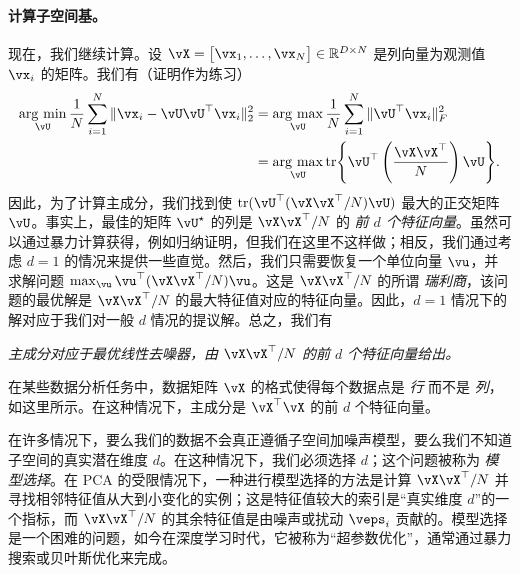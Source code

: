 \documentclass[../../book-main_zh.tex]{subfiles}
\begin{document}
\paragraph{计算子空间基。}
现在，我们继续计算。设 \(\vX = \mat{\vx_{1}, \dots, \vx_{N}} \in \R^{D \times N}\) 是列向量为观测值 \(\vx_{i}\) 的矩阵。我们有（证明作为练习）
\begin{align}
    \argmin_{\vU}\frac{1}{N}\sum_{i = 1}^{N}\norm{\vx_{i} - \vU\vU^{\top}\vx_{i}}_{2}^{2}
    &= \argmax_{\vU}\frac{1}{N}\sum_{i = 1}^{N}\norm{\vU^{\top}\vx_{i}}_{F}^{2} \\ 
    &= \argmax_{\vU}\tr\rc{\vU^{\top}\bp{\frac{\vX\vX^{\top}}{N}}\vU}.
\end{align}
因此，为了计算主成分，我们找到使 \(\tr(\vU^{\top}(\vX\vX^{\top}/N)\vU)\) 最大的正交矩阵 \(\vU\)。事实上，最佳的矩阵 \(\vU^{\star}\) 的列是 \(\vX\vX^{\top}/N\) 的 \textit{前 \(d\) 个特征向量}。虽然可以通过暴力计算获得，例如归纳证明，但我们在这里不这样做；相反，我们通过考虑 \(d = 1\) 的情况来提供一些直觉。然后，我们只需要恢复一个单位向量 \(\vu\)，并求解问题 \(\max_{\vu} \vu^{\top}(\vX\vX^{\top}/N)\vu\)。这是 \(\vX\vX^{\top}/N\) 的所谓 \textit{瑞利商}，该问题的最优解是 \(\vX\vX^{\top}/N\) 的最大特征值对应的特征向量。因此，\(d = 1\) 情况下的解对应于我们对一般 \(d\) 情况的提议解。总之，我们有
\begin{tcolorbox}
    \textit{主成分对应于最优线性去噪器，由 \(\vX\vX^{\top}/N\) 的前 \(d\) 个特征向量给出。}
\end{tcolorbox}

\begin{remark}
    在某些数据分析任务中，数据矩阵 \(\vX\) 的格式使得每个数据点是 \textit{行} 而不是 \textit{列}，如这里所示。在这种情况下，主成分是 \(\vX^{\top}\vX\) 的前 \(d\) 个特征向量。
\end{remark}

\begin{remark}
    在许多情况下，要么我们的数据不会真正遵循子空间加噪声模型，要么我们不知道子空间的真实潜在维度 \(d\)。在这种情况下，我们必须选择 \(d\)；这个问题被称为 \textit{模型选择}。在 PCA 的受限情况下，一种进行模型选择的方法是计算 \(\vX\vX^{\top}/N\) 并寻找相邻特征值从大到小变化的实例；这是特征值较大的索引是“真实维度 \(d\)”的一个指标，而 \(\vX\vX^{\top}/N\) 的其余特征值是由噪声或扰动 \(\veps_{i}\) 贡献的。模型选择是一个困难的问题，如今在深度学习时代，它被称为“超参数优化”，通常通过暴力搜索或贝叶斯优化来完成。%
\end{remark}
\end{document}
